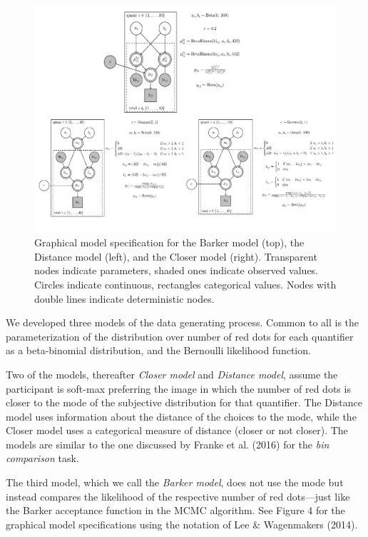 \documentclass[english,floatsintext,man]{apa6}
\begin{document}
\begin{figure}[htbp]
\centering
\includegraphics{model_graphs/models_combined.png}
\caption{Graphical model specification for the Barker model (top), the
Distance model (left), and the Closer model (right). Transparent nodes
indicate parameters, shaded ones indicate observed values. Circles
indicate continuous, rectangles categorical values. Nodes with double
lines indicate deterministic nodes.}
\end{figure}

We developed three models of the data generating process. Common to all
is the parameterization of the distribution over number of red dots for
each quantifier as a beta-binomial distribution, and the Bernoulli
likelihood function.

Two of the models, thereafter \emph{Closer model} and \emph{Distance
model}, assume the participant is soft-max preferring the image in which
the number of red dots is closer to the mode of the subjective
distribution for that quantifier. The Distance model uses information
about the distance of the choices to the mode, while the Closer model
uses a categorical measure of distance (closer or not closer). The
models are similar to the one discussed by Franke et al. (2016) for the
\emph{bin comparison} task.

The third model, which we call the \emph{Barker model}, does not use the
mode but instead compares the likelihood of the respective number of red
dots---just like the Barker acceptance function in the MCMC algorithm.
See Figure 4 for the graphical model specifications using the notation
of Lee \& Wagenmakers (2014).
\end{document}
